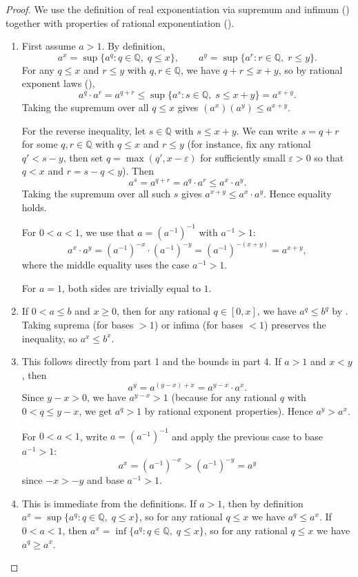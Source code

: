 \begin{proof}
We use the definition of real exponentiation via supremum and infimum () together with properties of rational exponentiation ().

\begin{enumerate}
    \item First assume $a > 1$. By definition,
    $$a^x = \sup\{a^q : q \in \mathbb{Q},\; q \leq x\}, \qquad a^y = \sup\{a^r : r \in \mathbb{Q},\; r \leq y\}.$$
    For any $q \leq x$ and $r \leq y$ with $q,r \in \mathbb{Q}$, we have $q+r \leq x+y$, so by rational exponent laws (),
    $$a^q \cdot a^r = a^{q+r} \leq \sup\{a^s : s \in \mathbb{Q},\; s \leq x+y\} = a^{x+y}.$$
    Taking the supremum over all $q \leq x$ gives $(a^x)(a^y) \leq a^{x+y}$.

    For the reverse inequality, let $s \in \mathbb{Q}$ with $s \leq x+y$. We can write $s = q+r$ for some $q,r \in \mathbb{Q}$ with $q \leq x$ and $r \leq y$ (for instance, fix any rational $q' < s-y$, then set $q = \max(q',x-\varepsilon)$ for sufficiently small $\varepsilon > 0$ so that $q < x$ and $r = s-q < y$). Then
    $$a^s = a^{q+r} = a^q \cdot a^r \leq a^x \cdot a^y.$$
    Taking the supremum over all such $s$ gives $a^{x+y} \leq a^x \cdot a^y$. Hence equality holds.

    For $0 < a < 1$, we use that $a = (a^{-1})^{-1}$ with $a^{-1} > 1$:
    $$a^x \cdot a^y = (a^{-1})^{-x} \cdot (a^{-1})^{-y} = (a^{-1})^{-(x+y)} = a^{x+y},$$
    where the middle equality uses the case $a^{-1} > 1$.

    For $a = 1$, both sides are trivially equal to $1$.

    \item If $0 < a \leq b$ and $x \geq 0$, then for any rational $q \in [0,x]$, we have $a^q \leq b^q$ by . Taking suprema (for bases $>1$) or infima (for bases $<1$) preserves the inequality, so $a^x \leq b^x$.

    \item This follows directly from part 1 and the bounds in part 4. If $a > 1$ and $x < y$, then
    $$a^y = a^{(y-x)+x} = a^{y-x} \cdot a^x.$$
    Since $y-x > 0$, we have $a^{y-x} > 1$ (because for any rational $q$ with $0 < q \leq y-x$, we get $a^q > 1$ by rational exponent properties). Hence $a^y > a^x$.

    For $0 < a < 1$, write $a = (a^{-1})^{-1}$ and apply the previous case to base $a^{-1} > 1$:
    $$a^x = (a^{-1})^{-x} > (a^{-1})^{-y} = a^y$$
    since $-x > -y$ and base $a^{-1} > 1$.

    \item This is immediate from the definitions. If $a > 1$, then by definition $a^x = \sup\{a^q : q \in \mathbb{Q},\; q \leq x\}$, so for any rational $q \leq x$ we have $a^q \leq a^x$. If $0 < a < 1$, then $a^x = \inf\{a^q : q \in \mathbb{Q},\; q \leq x\}$, so for any rational $q \leq x$ we have $a^q \geq a^x$.
\end{enumerate}
\end{proof}
